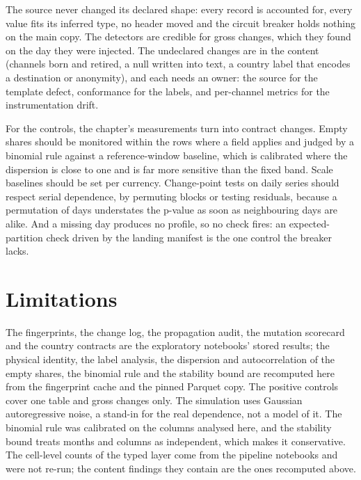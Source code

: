 The source never changed its declared shape: every record is accounted for, every value fits its inferred type, no
header moved and the circuit breaker holds nothing on the main copy. The detectors are credible for gross changes, which
they found on the day they were injected. The undeclared changes are in the content (channels born and retired, a null
written into text, a country label that encodes a destination or anonymity), and each needs an owner: the source for
the template defect, conformance for the labels, and per-channel metrics for the instrumentation drift.

For the controls, the chapter's measurements turn into contract changes. Empty shares should be monitored within the
rows where a field applies and judged by a binomial rule against a reference-window baseline, which is calibrated where
the dispersion is close to one and is far more sensitive than the fixed band. Scale baselines should be set per
currency. Change-point tests on daily series should respect serial dependence, by permuting blocks or testing
residuals, because a permutation of days understates the p-value as soon as neighbouring days are alike. And a missing
day produces no profile, so no check fires: an expected-partition check driven by the landing manifest is the one
control the breaker lacks.

\section{Limitations}\label{sec:sf-limits}

The fingerprints, the change log, the propagation audit, the mutation scorecard and the country contracts are the
exploratory notebooks' stored results; the physical identity, the label analysis, the dispersion and autocorrelation of
the empty shares, the binomial rule and the stability bound are recomputed here from the fingerprint cache and the
pinned Parquet copy. The positive controls cover one table and gross changes only. The simulation uses Gaussian
autoregressive noise, a stand-in for the real dependence, not a model of it. The binomial rule was calibrated on the
columns analysed here, and the stability bound treats months and columns as independent, which makes it conservative.
The cell-level counts of the typed layer come from the pipeline notebooks and were not re-run; the content findings they
contain are the ones recomputed above.
